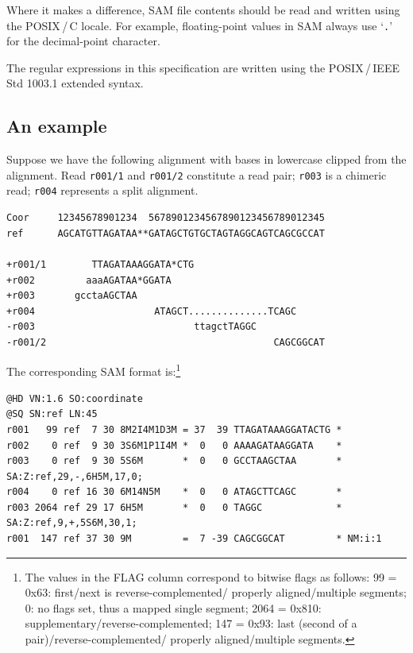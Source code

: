 \documentclass[10pt]{article}
\begin{document}
Where it makes a difference, SAM file contents should be read and written using the POSIX\,/\,C locale.
For example, floating-point values in SAM always use `{\tt .}' for the decimal-point character.

The regular expressions in this specification are written using the POSIX\,/\,IEEE Std 1003.1 extended syntax.

\subsection{An example}\label{sec:example}
Suppose we have the following alignment with bases in lowercase
clipped from the alignment. Read {\tt r001/1} and {\tt r001/2}
constitute a read pair; {\tt r003} is a chimeric read; {\tt r004}
represents a split alignment.

\begin{framed}\small
\begin{verbatim}
Coor     12345678901234  5678901234567890123456789012345
ref      AGCATGTTAGATAA**GATAGCTGTGCTAGTAGGCAGTCAGCGCCAT

+r001/1        TTAGATAAAGGATA*CTG
+r002         aaaAGATAA*GGATA
+r003       gcctaAGCTAA
+r004                     ATAGCT..............TCAGC
-r003                            ttagctTAGGC
-r001/2                                        CAGCGGCAT
\end{verbatim}
\end{framed}
The corresponding SAM format is:\footnote{The values in the
{\sf FLAG} column correspond to bitwise flags as follows:
99 = 0x63: first\slash next is reverse-complemented\slash
properly aligned\slash multiple segments;
0: no flags set, thus a mapped single segment;
2064 = 0x810: supplementary\slash reverse-complemented;
147 = 0x93: last (second of a pair)\slash reverse-complemented\slash
properly aligned\slash multiple segments.}
\begin{framed}\small
\begin{verbatim}
@HD VN:1.6 SO:coordinate
@SQ SN:ref LN:45
r001   99 ref  7 30 8M2I4M1D3M = 37  39 TTAGATAAAGGATACTG *
r002    0 ref  9 30 3S6M1P1I4M *  0   0 AAAAGATAAGGATA    *
r003    0 ref  9 30 5S6M       *  0   0 GCCTAAGCTAA       * SA:Z:ref,29,-,6H5M,17,0;
r004    0 ref 16 30 6M14N5M    *  0   0 ATAGCTTCAGC       *
r003 2064 ref 29 17 6H5M       *  0   0 TAGGC             * SA:Z:ref,9,+,5S6M,30,1;
r001  147 ref 37 30 9M         =  7 -39 CAGCGGCAT         * NM:i:1
\end{verbatim}
\end{framed}
\end{document}
